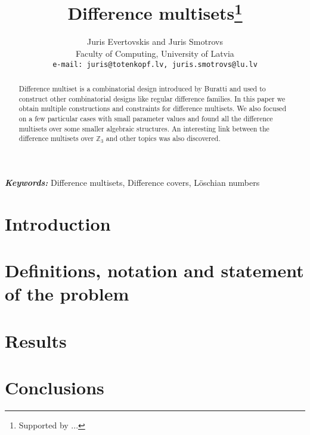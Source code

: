 \documentclass{article}
\theoremstyle{plain}
\theoremstyle{definition}
\theoremstyle{remark}
\providecommand{\keywords}[1]{\textbf{\textit{Keywords: }} #1}
\begin{document}
\title{Difference multisets\thanks{Supported by ...}}
\date{}
\author{Juris Evertovskis and Juris Smotrovs\\
\small Faculty of Computing, University of Latvia\\
{\small \tt e-mail: juris@totenkopf.lv, juris.smotrovs@lu.lv}}

\maketitle
	
	\begin{abstract}
		Difference multiset is a combinatorial design introduced by Buratti \cite{buratti1999old} and used to construct other combinatorial designs like regular difference families. In this paper we obtain multiple constructions and constraints for difference multisets. We also focused on a few particular cases with small parameter values and found all the difference multisets over some smaller algebraic structures. An interesting link between the difference multisets over $\mathbb Z_3$ and other topics was also discovered.
	\end{abstract}
	
	\keywords{Difference multisets, Difference covers, Löschian numbers}
    
    \section{Introduction}
    
     
	\section{Definitions, notation and statement of the problem}
    
	
    \section{Results}
    

    \section{Conclusions}
    
    
	
	 
	
\end{document}
